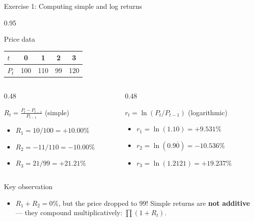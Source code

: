 \documentclass[9pt, aspectratio=169, t]{beamer}
\begin{document}
\begin{frame}[shrink=5]{Exercise 1: Computing simple and log returns}
    \begin{cminipage}{0.95\textwidth}
    \begin{block}{Price data}
    \begin{center}
    {\small\renewcommand{\arraystretch}{1.3}
    \begin{tabular}{lcccc}
    \toprule
    $t$ & 0 & 1 & 2 & 3 \\
    \midrule
    $P_t$ & 100 & 110 & 99 & 120 \\
    \bottomrule
    \end{tabular}}
    \end{center}
    \end{block}
    \vspace{0.1cm}
    \begin{columns}[T]
    \begin{column}{0.48\textwidth}
    \begin{exampleblock}{$R_t = \frac{P_t - P_{t-1}}{P_{t-1}}$ (simple)}
    \begin{itemize}\setlength{\itemsep}{0pt}
        \item $R_1 = 10/100 = \mathbf{+10.00\%}$
        \item $R_2 = -11/110 = \mathbf{-10.00\%}$
        \item $R_3 = 21/99 = \mathbf{+21.21\%}$
    \end{itemize}
    \end{exampleblock}
    \end{column}
    \begin{column}{0.48\textwidth}
    \begin{exampleblock}{$r_t = \ln(P_t / P_{t-1})$ (logarithmic)}
    \begin{itemize}\setlength{\itemsep}{0pt}
        \item $r_1 = \ln(1.10) = \mathbf{+9.531\%}$
        \item $r_2 = \ln(0.9\overline{0}) = \mathbf{-10.536\%}$
        \item $r_3 = \ln(1.2121) = \mathbf{+19.237\%}$
    \end{itemize}
    \end{exampleblock}
    \end{column}
    \end{columns}
    \vspace{0.1cm}
    \begin{alertblock}{Key observation}
    \begin{itemize}\setlength{\itemsep}{0pt}
        \item $R_1 + R_2 = 0\%$, but the price dropped to 99! Simple returns are \textbf{not additive} --- they compound multiplicatively: $\prod(1+R_t)$.
    \end{itemize}
    \end{alertblock}
    \end{cminipage}
\end{frame}
\end{document}
